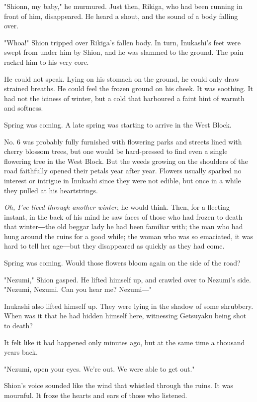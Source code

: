 "Shionn, my baby," he murmured. Just then, Rikiga, who had been running
in front of him, disappeared. He heard a shout, and the sound of a body
falling over.

"Whoa!" Shion tripped over Rikiga's fallen body. In turn, Inukashi's
feet were swept from under him by Shion, and he was slammed to the
ground. The pain racked him to his very core.

He could not speak. Lying on his stomach on the ground, he could only
draw strained breaths. He could feel the frozen ground on his cheek. It
was soothing. It had not the iciness of winter, but a cold that
harboured a faint hint of warmth and softness.

Spring was coming. A late spring was starting to arrive in the West
Block.

No. 6 was probably fully furnished with flowering parks and streets
lined with cherry blossom trees, but one would be hard-pressed to find
even a single flowering tree in the West Block. But the weeds growing on
the shoulders of the road faithfully opened their petals year after
year. Flowers usually sparked no interest or intrigue in Inukashi since
they were not edible, but once in a while they pulled at his
heartstrings.

\emph{Oh, I've lived through another winter}, he would think. Then, for a
fleeting instant, in the back of his mind he saw faces of those who had
frozen to death that winter―the old beggar lady he had been familiar
with; the man who had hung around the ruins for a good while; the woman
who was so emaciated, it was hard to tell her age―but they disappeared
as quickly as they had come.

Spring was coming. Would those flowers bloom again on the side of the
road?

"Nezumi," Shion gasped. He lifted himself up, and crawled over to
Nezumi's side. "Nezumi, Nezumi. Can you hear me? Nezumi―"

Inukashi also lifted himself up. They were lying in the shadow of some
shrubbery. When was it that he had hidden himself here, witnessing
Getsuyaku being shot to death?

It felt like it had happened only minutes ago, but at the same time a
thousand years back.

"Nezumi, open your eyes. We're out. We were able to get out."

Shion's voice sounded like the wind that whistled through the ruins. It
was mournful. It froze the hearts and ears of those who listened.

